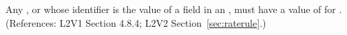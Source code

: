 Any \Compartment, \Species or \Parameter whose identifier is the value of a
 field in an \RateRule, must have a value of 
for .  (References: L2V1 Section 4.8.4; L2V2
Section~\ref{sec:raterule}.)
